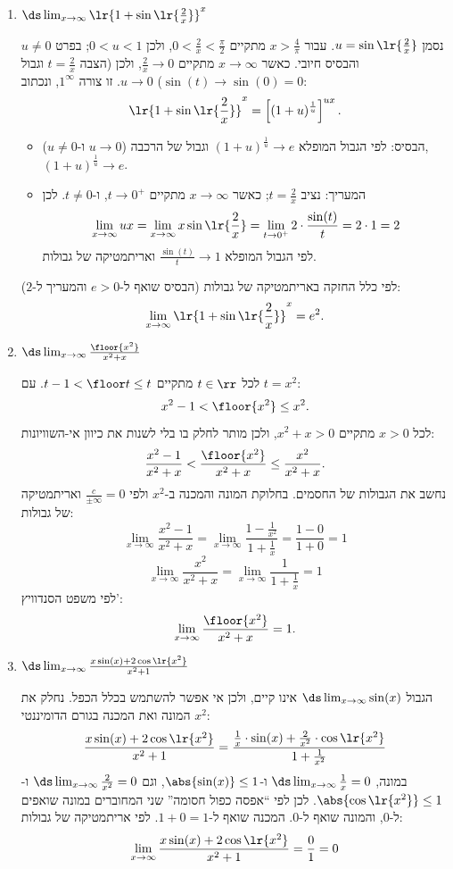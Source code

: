 \begin{enumerate}
\item $\ds\lim_{x\to\infty}\lr{1+\sin\lr{\frac{2}{x}}}^{x}$
\ifsol
{}
\begin{solbox}
נסמן $u=\sin\lr{\frac2x}$. עבור $x>\frac4\pi$ מתקיים $0<\frac2x<\frac\pi2$, ולכן $0<u<1$; בפרט $u\ne0$ והבסיס חיובי. כאשר $x\to\infty$ מתקיים $\frac2x\to0$, ולכן (הצבה $t=\frac2x$ וגבול $\sin(t)\to\sin(0)=0$) $u\to0$. זו צורה $1^\infty$, ונכתוב:
\[\lr{1+\sin\lr{\frac{2}{x}}}^{x}=\left[(1+u)^{\frac1u}\right]^{ux}.\]
\begin{itemize}
\item הבסיס: לפי הגבול המופלא $(1+u)^{\frac1u}\to e$ וגבול של הרכבה ($u\to0$ ו-$u\ne0$), $(1+u)^{\frac1u}\to e$.
\item המעריך: נציב $t=\frac2x$; כאשר $x\to\infty$ מתקיים $t\to0^+$, ו-$t\ne0$. לכן
\[\lim_{x\to\infty}ux=\lim_{x\to\infty}x\sin\lr{\frac2x}=\lim_{t\to0^+}2\cdot\frac{\sin(t)}{t}=2\cdot1=2\]
לפי הגבול המופלא $\frac{\sin(t)}{t}\to1$ ואריתמטיקה של גבולות.
\end{itemize}
לפי כלל החזקה באריתמטיקה של גבולות (הבסיס שואף ל-$e>0$ והמעריך ל-$2$):
\[\lim_{x\to\infty}\lr{1+\sin\lr{\frac{2}{x}}}^{x}=e^2.\]
\end{solbox}
\fi

\item $\ds\lim_{x\to\infty}\frac{\floor{x^2}}{x^2+x}$
\ifsol
{}
\begin{solbox}
לכל $t\in\rr$ מתקיים $t-1<\floor t\le t$. עם $t=x^2$:
\[x^2-1<\floor{x^2}\le x^2.\]
לכל $x>0$ מתקיים $x^2+x>0$, ולכן מותר לחלק בו בלי לשנות את כיוון אי-השוויונות:
\[\frac{x^2-1}{x^2+x}<\frac{\floor{x^2}}{x^2+x}\le\frac{x^2}{x^2+x}.\]
נחשב את הגבולות של החסמים. בחלוקת המונה והמכנה ב-$x^2$ ולפי $\frac{c}{\pm\infty}=0$ ואריתמטיקה של גבולות:
\[\lim_{x\to\infty}\frac{x^2-1}{x^2+x}=\lim_{x\to\infty}\frac{1-\frac{1}{x^2}}{1+\frac1x}=\frac{1-0}{1+0}=1\]
\[\lim_{x\to\infty}\frac{x^2}{x^2+x}=\lim_{x\to\infty}\frac{1}{1+\frac1x}=1\]
לפי משפט הסנדוויץ':
\[\lim_{x\to\infty}\frac{\floor{x^2}}{x^2+x}=1.\]
\end{solbox}
\fi

\item $\ds\lim_{x\to\infty}\frac{x\sin(x)+2\cos\lr{x^2}}{x^2+1}$
\ifsol
{}
\begin{solbox}
הגבול $\ds\lim_{x\to\infty}\sin(x)$ אינו קיים, ולכן אי אפשר להשתמש בכלל הכפל. נחלק את המונה ואת המכנה בגורם הדומיננטי $x^2$:
\[\frac{x\sin(x)+2\cos\lr{x^2}}{x^2+1}=\frac{\frac1x\cdot\sin(x)+\frac{2}{x^2}\cdot\cos\lr{x^2}}{1+\frac{1}{x^2}}\]
במונה, $\ds\lim_{x\to\infty}\frac1x=0$ ו-$\abs{\sin(x)}\le1$, וגם $\ds\lim_{x\to\infty}\frac{2}{x^2}=0$ ו-$\abs{\cos\lr{x^2}}\le1$. לכן לפי ``אפסה כפול חסומה'' שני המחוברים במונה שואפים ל-$0$, והמונה שואף ל-$0$. המכנה שואף ל-$1+0=1$. לפי אריתמטיקה של גבולות:
\[\lim_{x\to\infty}\frac{x\sin(x)+2\cos\lr{x^2}}{x^2+1}=\frac{0}{1}=0\]
\end{solbox}
\fi

\eMs
\end{enumerate}
